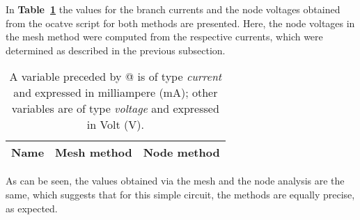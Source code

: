 In \textbf{Table~\ref{tab:theoretical}} the values for the branch currents and the node voltages obtained from the ocatve script for both methods are presented. Here, the node voltages in the mesh method were computed from the respective currents, which were determined as described in the previous subsection.
\begin{table}[h]
  \centering
  \begin{tabular}{|l|r|r|}
    \hline    
    {\bf Name} & {\bf Mesh method} & {\bf Node method}\\ \hline
    
  \end{tabular}
  \caption{A variable preceded by @ is of type {\em current}
    and expressed in milliampere (mA); other variables are of type {\it voltage} and expressed in
    Volt (V).}
  \label{tab:theoretical}
\end{table}

As can be seen, the values obtained via the mesh and the node analysis are the same, which suggests that for this simple circuit, the methods are equally precise, as expected.
